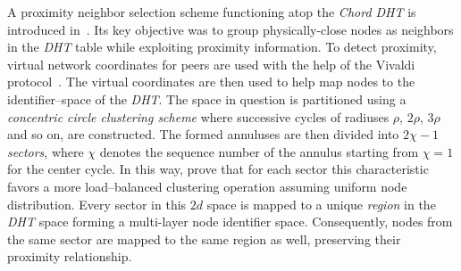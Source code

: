 
A proximity neighbor selection scheme functioning atop 
the \emph{Chord DHT} is introduced in~\cite{DLTZZ2006}.
Its key objective was to group physically-close nodes as 
neighbors in the \emph{DHT} table while exploiting proximity information.
To detect proximity, virtual network coordinates for 
peers are used with the help of the Vivaldi protocol~\cite{cox_vivaldi_2004}. 
The virtual coordinates are then used to help map nodes to 
the identifier--space of the \emph{DHT}.
The space in question is partitioned using a 
\emph{concentric circle clustering scheme} where successive cycles of
radiuses $\rho$, $2\rho$, $3\rho$ and so on, are constructed. 
The formed annuluses are then divided into 
$2\chi-1$ \emph{sectors}, where $\chi$ denotes the
sequence number of the annulus starting from $\chi = 1$ 
for the center cycle. 
In this way, 
\cite{DLTZZ2006} prove that for each sector
this characteristic favors a more load--balanced clustering operation
assuming uniform node distribution.
Every sector in this $2d$ space is mapped to 
a unique \emph{region} in the \emph{DHT} space forming a
multi-layer node identifier space.  
Consequently, nodes from the same
sector are mapped to the same region as well, 
preserving their proximity relationship. 

